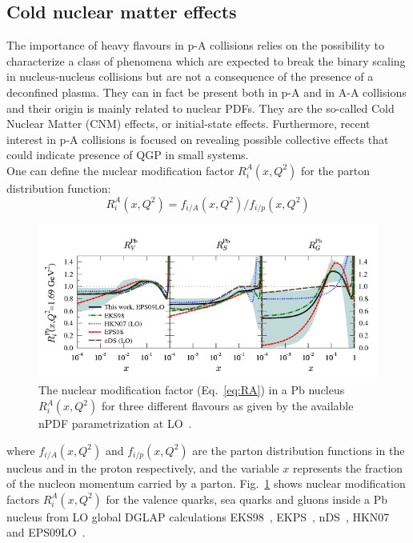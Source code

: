 \subsection{Cold nuclear matter effects}
The importance of heavy flavours in p-A collisions relies on the possibility to
characterize a class of phenomena which are expected to break the binary scaling in 
nucleus-nucleus collisions but are not a consequence of the presence of a 
deconfined plasma. They can in fact be present both in p-A and in A-A collisions and
their origin is mainly related to nuclear PDFs. They are the so-called Cold Nuclear Matter (CNM) effects,
or initial-state effects.
Furthermore, recent interest in p-A collisions
is focused on revealing possible collective effects that could indicate presence of QGP in small systems.\\
One can define the nuclear modification factor $R_i^A(x,Q^2)$ for the parton distribution function:
\begin{equation}
\label{eq:RA}
R_i^A(x,Q^2) = f_{i/A}(x,Q^2) / f_{i/p}(x,Q^2)
\end{equation}
\begin{figure}[!ht]
  \centering
  \includegraphics[width=15cm]{FigCap1/PartonNMF.png}
  \caption{The nuclear modification factor (Eq.~\ref{eq:RA}) in a Pb nucleus $R_i^A(x,Q^2)$ for three different flavours as given by the
available nPDF parametrization at LO~\cite{Eskola:2009uj}.}
  \label{fig:nPDF}
\end{figure}
where $f_{i/A}(x,Q^2)$ and $f_{i/p}(x,Q^2)$ are the parton distribution functions in the 
nucleus and in the proton respectively, and the variable $x$ represents the fraction of 
the nucleon momentum carried by a parton. Fig.~\ref{fig:nPDF} 
shows nuclear modification factors $R_i^A(x,Q^2)$ for the valence quarks, sea quarks and 
gluons inside a Pb nucleus from LO global DGLAP calculations EKS98~\cite{Eskola:1998df,Eskola:1998iy}, 
EKPS~\cite{Eskola:2007my},
nDS~\cite{Eskola:2008ca}, HKN07~\cite{Hirai:2007sx} and EPS09LO~\cite{Eskola:2009uj}. 
